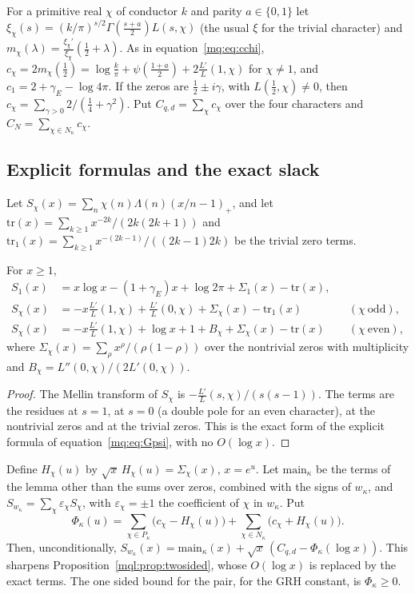For a primitive real $\chi$ of conductor $k$ and parity $a\in\{0,1\}$ let $\xi_\chi(s)=(k/\pi)^{s/2}\Gamma(\frac{s+a}2)L(s,\chi)$ (the usual $\xi$ for the trivial character) and $m_\chi(\lambda)=\frac{\xi_\chi'}{\xi_\chi}(\frac12+\lambda)$. As in equation~\eqref{mq:eq:cchi}, $c_\chi=2m_\chi(\frac12)=\log\frac k\pi+\psi(\frac{1+a}2)+2\frac{L'}L(1,\chi)$ for $\chi\ne1$, and $c_1=2+\gamma_E-\log4\pi$. If the zeros are $\frac12\pm i\gamma$, with $L(\frac12,\chi)\ne0$, then $c_\chi=\sum_{\gamma>0}2/(\frac14+\gamma^2)$. Put $C_{q,d}=\sum_\chi c_\chi$ over the four characters and $C_N=\sum_{\chi\in N_\kappa}c_\chi$.

\subsection{Explicit formulas and the exact slack}\label{mqf:sub:explicit}

Let $S_\chi(x)=\sum_n\chi(n)\Lambda(n)(x/n-1)_+$, and let $\mathrm{tr}(x)=\sum_{k\ge1}x^{-2k}/(2k(2k+1))$ and $\mathrm{tr}_1(x)=\sum_{k\ge1}x^{-(2k-1)}/((2k-1)2k)$ be the trivial zero terms.

\begin{lemma}\label{mqf:lem:explicit}
For $x\ge1$,
\[
\begin{aligned}
S_1(x)&=x\log x-(1+\gamma_E)x+\log2\pi+\Sigma_1(x)-\mathrm{tr}(x),\\
S_\chi(x)&=-x\tfrac{L'}{L}(1,\chi)+\tfrac{L'}{L}(0,\chi)+\Sigma_\chi(x)-\mathrm{tr}_1(x)&&(\chi\ \text{odd}),\\
S_\chi(x)&=-x\tfrac{L'}{L}(1,\chi)+\log x+1+B_\chi+\Sigma_\chi(x)-\mathrm{tr}(x)&&(\chi\ \text{even}),
\end{aligned}
\]
where $\Sigma_\chi(x)=\sum_\rho x^\rho/(\rho(1-\rho))$ over the nontrivial zeros with multiplicity and $B_\chi=L''(0,\chi)/(2L'(0,\chi))$.
\end{lemma}

\begin{proof}
The Mellin transform of $S_\chi$ is $-\frac{L'}L(s,\chi)/(s(s-1))$. The terms are the residues at $s=1$, at $s=0$ (a double pole for an even character), at the nontrivial zeros and at the trivial zeros. This is the exact form of the explicit formula of equation~\eqref{mq:eq:Gpsi}, with no $O(\log x)$.
\end{proof}

Define $H_\chi(u)$ by $\sqrt x\,H_\chi(u)=\Sigma_\chi(x)$, $x=e^u$. Let $\mathrm{main}_\kappa$ be the terms of the lemma other than the sums over zeros, combined with the signs of $w_\kappa$, and $S_{w_\kappa}=\sum_\chi\varepsilon_\chi S_\chi$, with $\varepsilon_\chi=\pm1$ the coefficient of $\chi$ in $w_\kappa$. Put
\[
\Phi_\kappa(u)=\sum_{\chi\in P_\kappa}\bigl(c_\chi-H_\chi(u)\bigr)+\sum_{\chi\in N_\kappa}\bigl(c_\chi+H_\chi(u)\bigr).
\]
Then, unconditionally, $S_{w_\kappa}(x)=\mathrm{main}_\kappa(x)+\sqrt x\,(C_{q,d}-\Phi_\kappa(\log x))$. This sharpens Proposition~\ref{mql:prop:twosided}, whose $O(\log x)$ is replaced by the exact terms. The one sided bound for the pair, for the GRH constant, is $\Phi_\kappa\ge0$.

